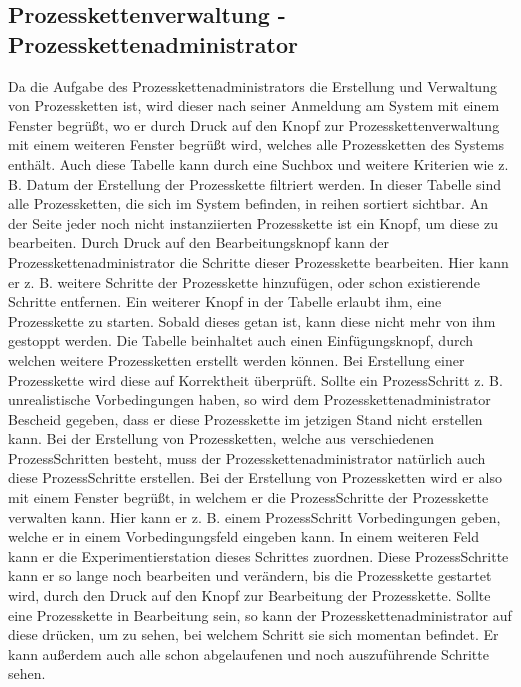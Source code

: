\documentclass[enabledeprecatedfontcommands,fontsize=12pt,paper=a4,twoside]{scrartcl}
\begin{document}
\subsection{Prozesskettenverwaltung - Prozesskettenadministrator}

Da die Aufgabe des Prozesskettenadministrators die Erstellung und Verwaltung von Prozessketten ist, wird dieser nach seiner Anmeldung am System mit einem Fenster begrüßt, wo er durch Druck auf den Knopf zur Prozesskettenverwaltung mit einem weiteren Fenster begrüßt wird, welches alle Prozessketten des Systems enthält.
Auch diese Tabelle kann durch eine Suchbox und weitere Kriterien wie z. B. Datum der Erstellung der Prozesskette filtriert werden.
In dieser Tabelle sind alle Prozessketten, die sich im System befinden, in reihen sortiert sichtbar. An der Seite jeder noch nicht instanziierten Prozesskette ist ein Knopf, um diese zu bearbeiten. Durch Druck auf den Bearbeitungsknopf kann der Prozesskettenadministrator die Schritte dieser Prozesskette bearbeiten. Hier kann er z. B. weitere Schritte der Prozesskette hinzufügen, oder schon existierende Schritte entfernen.
Ein weiterer Knopf in der Tabelle erlaubt ihm, eine Prozesskette zu starten. Sobald dieses getan ist, kann diese nicht mehr von ihm gestoppt werden.
Die Tabelle beinhaltet auch einen Einfügungsknopf, durch welchen weitere Prozessketten erstellt werden können.
Bei Erstellung einer Prozesskette wird diese auf Korrektheit überprüft. Sollte ein ProzessSchritt z. B. unrealistische Vorbedingungen haben, so wird dem Prozesskettenadministrator Bescheid gegeben, dass er diese Prozesskette im jetzigen Stand nicht erstellen kann.
Bei der Erstellung von Prozessketten, welche aus verschiedenen ProzessSchritten besteht, muss der Prozesskettenadministrator natürlich auch diese ProzessSchritte erstellen. Bei der Erstellung von Prozessketten wird er also mit einem Fenster begrüßt, in welchem er die ProzessSchritte der Prozesskette verwalten kann.
Hier kann er z. B. einem ProzessSchritt Vorbedingungen geben, welche er in einem Vorbedingungsfeld eingeben kann. In einem weiteren Feld kann er die Experimentierstation dieses Schrittes zuordnen. Diese ProzessSchritte kann er so lange noch bearbeiten und verändern, bis die Prozesskette gestartet wird, durch den Druck auf den Knopf zur Bearbeitung der Prozesskette.
Sollte eine Prozesskette in Bearbeitung sein, so kann der Prozesskettenadministrator auf diese drücken, um zu sehen, bei welchem Schritt sie sich momentan befindet. Er kann außerdem auch alle schon abgelaufenen und noch auszuführende Schritte sehen.
 
\end{document}

